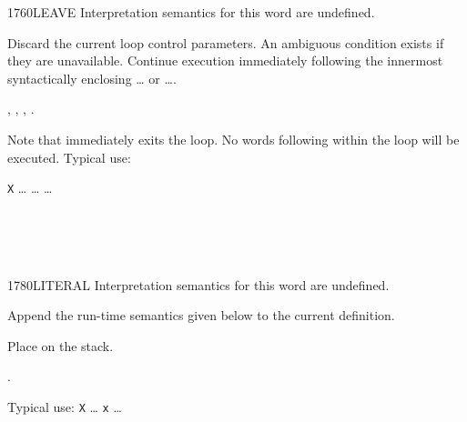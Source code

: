 \begin{worddef}{1760}{LEAVE}
\interpret
	Interpretation semantics for this word are undefined.

\execute
	\stack{}{}

	Discard the current loop control parameters. An ambiguous condition
	exists if they are unavailable. Continue execution immediately
	following the innermost syntactically enclosing
	\ldots{} or \ldots{}.

\see {},
	,
	,
	.

	\begin{rationale} %
		Note that  immediately exits the loop. No words
		following  within the loop will be executed.
		Typical use:

		\tab \word{:} \texttt{X} {\ldots} 
			{\ldots} 
				{\ldots} 
		\word{;}
	\end{rationale}

	\begin{testing} %
		 \\
		 \\
		 \\
	\end{testing}
\end{worddef}


\begin{worddef}{1780}{LITERAL}
\interpret
	Interpretation semantics for this word are undefined.

\compile

	Append the run-time semantics given below to the current definition.

\runtime

	Place  on the stack.

\see {}.

	\begin{rationale} %
		Typical use:
			\word{:} \texttt{X} {\ldots}
				\word{[} \texttt{x} \word{]} 
			{\ldots} \word{;}
	\end{rationale}

	\begin{testing} %
		 \\
	\end{testing}
\end{worddef}


